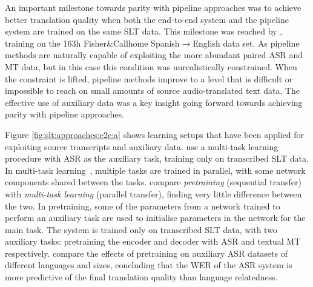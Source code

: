 \documentclass{svjour3}
\newcommand{\lp}[2]{#1$\rightarrow$#2}
\begin{document}
An important milestone towards parity with pipeline approaches was to achieve better translation quality when both the end-to-end system and the pipeline system are trained on the same SLT data.
This milestone was reached by \citet{weiss-s2s-st-2017},
training on the 163h Fisher\&Callhome \lp{Spanish}{English} data set. As pipeline methods are naturally capable of exploiting the more abundant paired ASR and MT data, but in this case
this condition was unrealistically constrained.
When the constraint is lifted, pipeline methods improve to a level that is difficult or impossible to reach on small amounts of source audio-translated text data.
The effective use of auxiliary data 
was a key insight going forward towards achieving parity with pipeline approaches.

Figure \ref{fig:slt:approaches:e2e:a}
shows learning setups that have been applied for exploiting source transcripts and auxiliary data.
\citet{weiss-s2s-st-2017} use a multi-task learning procedure with ASR as the auxiliary task, training only on transcribed SLT data.
In multi-task learning~\citep{caruana1997multitask}, multiple tasks are trained in parallel, with some network components shared between the tasks.
\citet{berard-e2e-audiobooks-2018} compare \emph{pretraining} (sequential transfer) with \emph{multi-task learning} (parallel transfer),
finding very little difference between the two.
In pretraining, some of the parameters from a network trained to perform an auxiliary task are used to initialise parameters in the network for the main task.
The system is trained only on transcribed SLT data,
with two auxiliary tasks:
pretraining the encoder and decoder with ASR and textual MT respectively.
\citet{stoian2019analyzing} compare the effects of pretraining on auxiliary ASR datasets of different languages and sizes, concluding that the WER of the ASR system is more predictive of the final translation quality than language relatedness.
\end{document}
